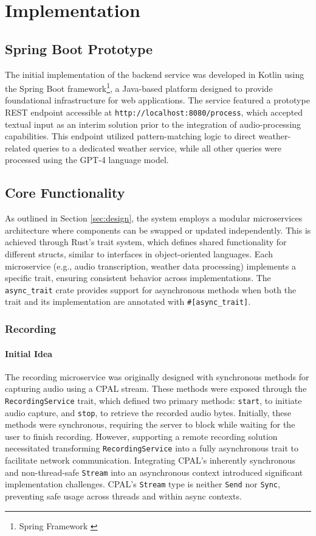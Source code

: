 \renewcommand*\chapterpagestyle{scrheadings}
\chapter{Implementation}

\section{Spring Boot Prototype}
The initial implementation of the backend service was developed in Kotlin using the Spring Boot framework\footnote{Spring Framework \cite{spring}},
a Java-based platform designed to provide foundational infrastructure for web applications.
The service featured a prototype REST endpoint accessible at \texttt{http://localhost:8080/process},
which accepted textual input as an interim solution prior to the integration of audio-processing capabilities.
This endpoint utilized pattern-matching logic to direct weather-related queries to a dedicated weather service,
while all other queries were processed using the GPT-4 language model.

\section{Core Functionality}
As outlined in Section \ref{sec:design}, the system employs a modular microservices architecture where components can be swapped or updated independently.
This is achieved through Rust's trait system, which defines shared functionality for different structs, similar to interfaces in object-oriented languages.
Each microservice (e.g., audio transcription, weather data processing) implements a specific trait, ensuring consistent behavior across implementations.
The \texttt{async\_trait} crate provides support for asynchronous methods when both the trait and its implementation are annotated with \texttt{\#[async\_trait]}.

\subsection{Recording}

\subsubsection{Initial Idea}
The recording microservice was originally designed with synchronous methods for capturing audio using a CPAL stream.
These methods were exposed through the \texttt{RecordingService} trait, which defined two primary methods: \texttt{start},
to initiate audio capture, and \texttt{stop}, to retrieve the recorded audio bytes.
Initially, these methods were synchronous, requiring the server to block while waiting for the user to finish recording.
However, supporting a remote recording solution necessitated transforming \texttt{RecordingService} into a fully asynchronous trait to facilitate network communication.
Integrating CPAL's inherently synchronous and non-thread-safe \texttt{Stream} into an asynchronous context introduced significant implementation challenges.
CPAL's \texttt{Stream} type is neither \texttt{Send} nor \texttt{Sync}, preventing safe usage across threads and within async contexts.

